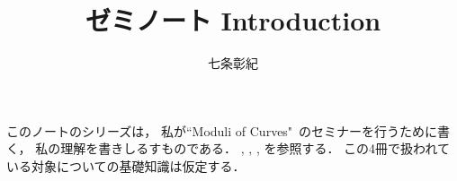 \documentclass[a4paper]{jsarticle}
\begin{document}
\title{ゼミノート Introduction}
\author{七条彰紀}
\maketitle

このノートのシリーズは，
私が``Moduli of Curves"~\cite{HaMo}のセミナーを行うために書く，
私の理解を書きしるすものである．
\cite{HarAG}, \cite{Ati-Mac}, \cite{Mat}, \cite{Awodey}を参照する．
この4冊で扱われている対象についての基礎知識は仮定する．



\end{document}
